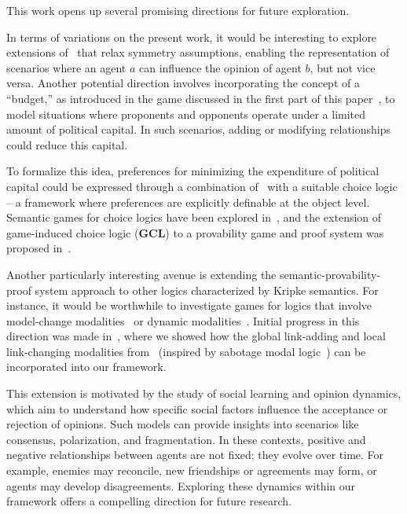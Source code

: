
This work opens up several promising directions for future exploration.

In terms of variations on the present work, it would be interesting to explore extensions of \PNL\ that relax symmetry assumptions, enabling the representation of scenarios where an agent $a$ can influence the opinion of agent $b$, but not vice versa. Another potential direction involves incorporating the concept of a ``budget,'' as introduced in the game discussed in the first part of this paper~\cite{DBLP:conf/tableaux/LangOPF19}, to model situations where proponents and opponents operate under a limited amount of political capital. In such scenarios, adding or modifying relationships could reduce this capital.

To formalize this idea, preferences for minimizing the expenditure of political capital could be expressed through a combination of \PNL\ with a suitable choice logic -- a framework where preferences are explicitly definable at the object level. Semantic games for choice logics have been explored in~\cite{Freiman2023TruthLogic}, and the extension of game-induced choice logic (\textbf{GCL}) to a provability game and proof system was proposed in~\cite{Freiman2023}. 

Another particularly interesting avenue is extending the semantic-provability-proof system approach to other logics characterized by Kripke semantics. For instance, it would be worthwhile to investigate games for logics that involve model-change modalities~\cite{DBLP:journals/logcom/Velazquez-Quesada17,DBLP:journals/igpl/PerrotinV21} or dynamic modalities~\cite{DBLP:journals/synthese/BenthemGL08}. Initial progress in this direction was made in~\cite{LPAR2024:Reasoning_About_Group_Polarization}, where we showed how the global link-adding and local link-changing modalities from~\cite{DBLP:journals/logcom/PedersenSA21} (inspired by sabotage modal logic~\cite{DBLP:journals/igpl/ArecesFH15,DBLP:journals/logcom/AucherBG18,DBLP:journals/logcom/BenthemLSY23}) can be incorporated into our framework.

This extension is motivated by the study of social learning and opinion dynamics, which aim to understand how specific social factors influence the acceptance or rejection of opinions. Such models can provide insights into scenarios like consensus, polarization, and fragmentation. In these contexts, positive and negative relationships between agents are not fixed; they evolve over time. For example, enemies may reconcile, new friendships or agreements may form, or agents may develop disagreements. Exploring these dynamics within our framework offers a compelling direction for future research. 

